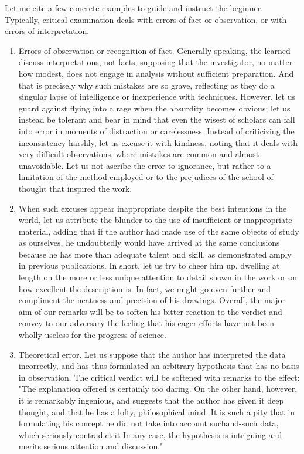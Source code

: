 \documentclass{article}
\begin{document}
Let me cite a few concrete examples to guide and instruct the beginner. Typically, critical examination deals with errors of fact or observation, or with errors of interpretation.

\begin{enumerate}  \item Errors of observation or recognition of fact. Generally speaking, the learned discuss interpretations, not facts, supposing that the investigator, no matter how modest, does not engage in analysis without sufficient preparation. And that is precisely why such mistakes are so grave, reflecting as they do a singular lapse of intelligence or inexperience with techniques. However, let us guard against flying into a rage when the absurdity becomes obvious; let us instead be tolerant and bear in mind that even the wisest of scholars can fall into error in moments of distraction or carelessness. Instead of criticizing the inconsistency harshly, let us excuse it with kindness, noting that it deals with very difficult observations, where mistakes are common and almost unavoidable. Let us not ascribe the error to ignorance, but rather to a limitation of the method employed or to the prejudices of the school of thought that inspired the work.  \item When such excuses appear inappropriate despite the best intentions in the world, let us attribute the blunder to the use of insufficient or inappropriate material, adding that if the author had made use of the same objects of study as ourselves, he undoubtedly would have arrived at the same conclusions because he has more than adequate talent and skill, as demonstrated amply in previous publications. In short, let us try to cheer him up, dwelling at length on the more or less unique attention to detail shown in the work or on how excellent the description is. In fact, we might go even further and compliment the neatness and precision of his drawings. Overall, the major aim of our remarks will be to soften his bitter reaction to the verdict and convey to our adversary the feeling that his eager efforts have not been wholly useless for the progress of science.  \item Theoretical error. Let us suppose that the author has interpreted the data incorrectly, and has thus formulated an arbitrary hypothesis that has no basis in observation. The critical verdict will be softened with remarks to the effect: "The explanation offered is certainly too daring. On the other hand, however, it is remarkably ingenious, and suggests that the author has given it deep thought, and that he has a lofty, philosophical mind. It is such a pity that in formulating his concept he did not take into account suchand-such data, which seriously contradict it\! In any case, the hypothesis is intriguing and merits serious attention and discussion." \end{enumerate}
\end{document}
